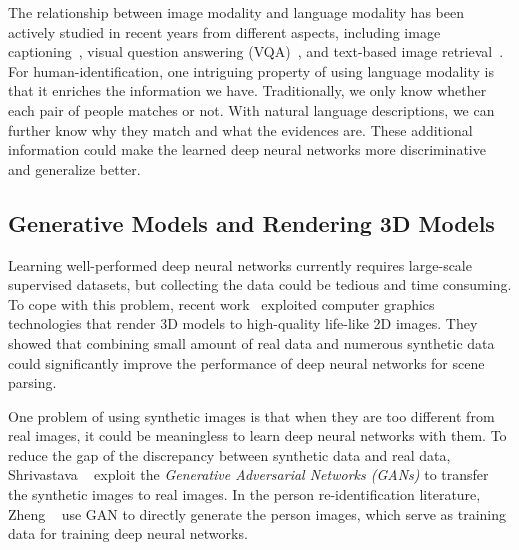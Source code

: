 The relationship between image modality and language modality has been actively studied in recent years from different aspects, including image captioning~\cite{karpathy2015deep,xu2015show,vinyals2015show,johnson2016densecap}, visual question answering (VQA)~\cite{antol2015vqa,ren2015exploring,malinowski2015ask,johnson2016clevr}, and text-based image retrieval~\cite{reed2016learning}. For human-identification, one intriguing property of using language modality is that it enriches the information we have. Traditionally, we only know whether each pair of people matches or not. With natural language descriptions, we can further know why they match and what the evidences are. These additional information could make the learned deep neural networks more discriminative and generalize better.

\subsection{Generative Models and Rendering 3D Models} %
\label{sub:human-id-generative-models}
Learning well-performed deep neural networks currently requires large-scale supervised datasets, but collecting the data could be tedious and time consuming. To cope with this problem, recent work~\cite{richter2016playing,chen2017photographic} exploited computer graphics technologies that render 3D models to high-quality life-like 2D images. They showed that combining small amount of real data and numerous synthetic data could significantly improve the performance of deep neural networks for scene parsing.

One problem of using synthetic images is that when they are too different from real images, it could be meaningless to learn deep neural networks with them. To reduce the gap of the discrepancy between synthetic data and real data, Shrivastava \etal~\cite{shrivastava2017learning} exploit the \emph{Generative Adversarial Networks (GANs)} to transfer the synthetic images to real images. In the person re-identification literature, Zheng \etal~\cite{zheng2017unlabeled} use GAN to directly generate the person images, which serve as training data for training deep neural networks.

